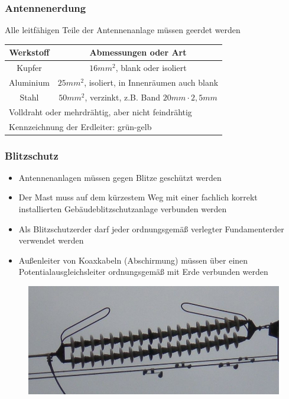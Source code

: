 \begin{frame}
  \frametitle{Antennenerdung}
  Alle leitfähigen Teile der Antennenanlage müssen geerdet werden\\[1.5em]
  \begin{tabular}{|c|c|}
    \hline
    \textbf{Werkstoff} & \textbf{Abmessungen oder Art} \\ \hline
    Kupfer & $16 mm^2$, blank oder isoliert \\ \hline
    Aluminium & $25 mm^2$, isoliert, in Innenräumen auch blank \\ \hline
    Stahl & $50 mm^2$, verzinkt, z.B. Band $20mm \cdot 2,5mm$ \\ \hline
    \multicolumn{2}{|l|}{Volldraht oder mehrdrähtig, aber nicht feindrähtig} \\
    \multicolumn{2}{|l|}{Kennzeichnung der Erdleiter: grün-gelb} \\ \hline
  \end{tabular}
\end{frame}

\begin{frame}
  \frametitle{Blitzschutz}
  \begin{itemize}
    \item Antennenanlagen müssen gegen Blitze geschützt werden
    \item Der Mast muss auf dem kürzestem Weg mit einer fachlich korrekt installierten Gebäudeblitzschutzanlage verbunden werden
    \item Als Blitzschutzerder darf jeder ordnungsgemäß verlegter Fundamenterder verwendet werden
    \item Außenleiter von Koaxkabeln (Abschirmung) müssen über einen Potentialausgleichsleiter ordnungsgemäß mit Erde verbunden werden
  \end{itemize}
  \begin{center}
    \begin{figure}
      \includegraphics[width=.5\textwidth,height=.3\textheight,keepaspectratio]{e18/Funkenstrecke}
    \end{figure}
  \end{center}

\end{frame}


